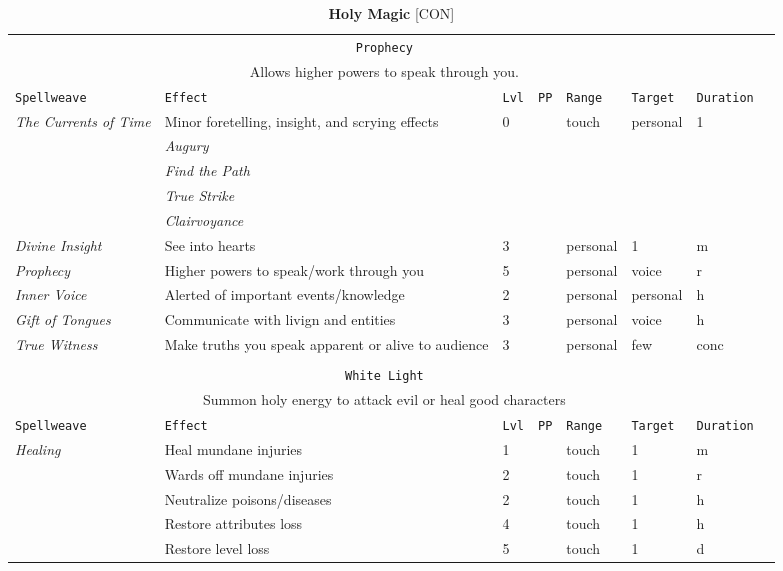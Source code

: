 \documentclass[10pt,a4paper]{article}
\begin{document}
\newpage
\begin{table}[htbp!]
\caption*{\textbf{\Large{Holy Magic}} [CON]}
\begin{tabular}{llllllll}
   \multicolumn{7}{c}{\texttt{Prophecy}}\\
  \multicolumn{7}{c}{Allows higher powers to speak through you.}\\
    \hline
    \texttt{Spellweave} & \texttt{Effect} & \texttt{Lvl} & \texttt{PP} & \texttt{Range} & \texttt{Target} & \texttt{Duration} \\
    \hline
    \multirow{1}{*}{\textit{The Currents of Time}} & Minor foretelling, insight, and scrying effects & 0 && touch & personal & 1\\
												  & \textit{Augury} & &&  &  & \\
												  & \textit{Find the Path} & &&  &  & \\
												  & \textit{True Strike}  & &&  &  & \\
												  & \textit{Clairvoyance} & &&  &  & \\
    \hline
    \multirow{1}{*}{\textit{Divine Insight}} & See into hearts & 3 && personal & 1 & m\\
    \hline
    \multirow{1}{*}{\textit{Prophecy}} & Higher powers to speak/work through you & 5 && personal & voice & r\\
    \hline
    \multirow{1}{*}{\textit{Inner Voice}} & Alerted of important events/knowledge & 2 && personal & personal & h\\
    \hline
    \multirow{1}{*}{\textit{Gift of Tongues}} & Communicate with livign and entities & 3 && personal & voice & h\\
    \hline
    \multirow{1}{*}{\textit{True Witness}} & Make truths you speak apparent or alive to audience & 3 && personal & few & conc\\
    &&&&&&\\
    
    
  \multicolumn{7}{c}{\texttt{White Light}}\\
  \multicolumn{7}{c}{Summon holy energy to attack evil or heal good characters}\\
    \hline
    \texttt{Spellweave} & \texttt{Effect} & \texttt{Lvl} & \texttt{PP} & \texttt{Range} & \texttt{Target} & \texttt{Duration} \\
    \hline
    \multirow{1}{*}{\textit{Healing}} & Heal mundane injuries & 1 && touch & 1 & m\\
        							& Wards off mundane injuries & 2 && touch & 1 & r\\
    								& Neutralize poisons/diseases & 2 && touch & 1 & h\\
    								& Restore attributes loss & 4 && touch  & 1 & h\\
    								& Restore level loss & 5 && touch & 1 & d\\
    

\end{tabular}
\end{table}
\end{document}
